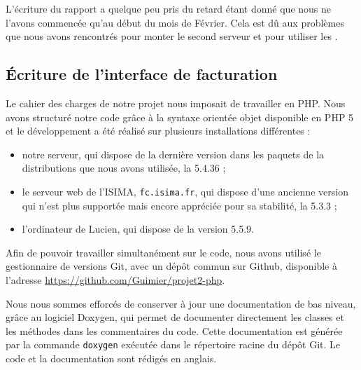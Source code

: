L'écriture du rapport a quelque peu pris du retard étant donné que nous ne l'avons commencée qu'au début du mois de Février. Cela est dû aux problèmes que nous avons rencontrés pour monter le second serveur et pour utiliser les {\cph}.


\subsection{Écriture de l’interface de facturation}

Le cahier des charges de notre projet nous imposait de travailler en PHP. Nous avons structuré notre code grâce à la syntaxe orientée objet disponible en PHP 5 et le développement a été réalisé sur plusieurs installations différentes :
\begin{itemize}
	\item notre serveur, qui dispose de la dernière version dans les paquets de la distributions que nous avons utilisée, la 5.4.36 ;
	\item le serveur web de l’ISIMA, \texttt{fc.isima.fr}, qui dispose d’une ancienne version qui n’est plus supportée mais encore appréciée pour sa stabilité, la 5.3.3 ;
	\item l’ordinateur de Lucien, qui dispose de la version 5.5.9.
\end{itemize}

Afin de pouvoir travailler simultanément sur le code, nous avons utilisé le gestionnaire de versions Git, avec un dépôt commun sur Github, disponible à l’adresse \url{https://github.com/Guimier/projet2-php}.

Nous nous sommes efforcés de conserver à jour une documentation de bas niveau, grâce au logiciel Doxygen, qui permet de documenter directement les classes et les méthodes dans les commentaires du code. Cette documentation est générée par la commande \texttt{doxygen} exécutée dans le répertoire racine du dépôt Git. Le code et la documentation sont rédigés en anglais.
